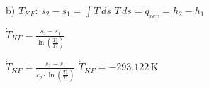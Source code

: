 b) \( T_{KF} \):  
\( s_2 - s_1 = \int T \, ds \)  
\( T \, ds = q_{rev} = h_2 - h_1 \)  

\( \dot{T}_{KF} = \frac{s_2 - s_1}{\ln \left( \frac{T_2}{T_1} \right)} \)  

\( \dot{T}_{KF} = \frac{s_2 - s_1}{c_p \cdot \ln \left( \frac{T_2}{T_1} \right)} \)  
\( \dot{T}_{KF} = -293.122 \, \text{K} \)